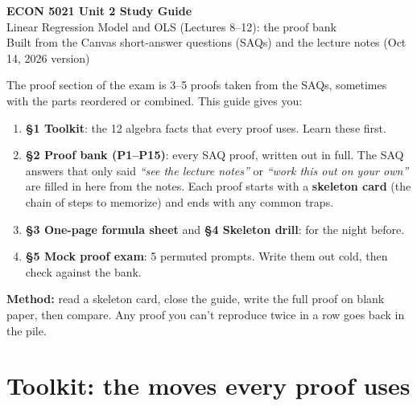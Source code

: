 \documentclass[11pt]{article}
\begin{document}
\begin{center}
{\LARGE\bfseries\color{ink} ECON 5021 Unit 2 Study Guide}\\[4pt]
{\large Linear Regression Model and OLS (Lectures 8--12): the proof bank}\\[2pt]
{\small Built from the Canvas short-answer questions (SAQs) and the lecture notes (Oct 14, 2026 version)}
\end{center}

\begin{tcolorbox}[colback=white,colframe=key,boxrule=0.8pt,arc=2pt,title={\bfseries How to use this guide}]
The proof section of the exam is 3--5 proofs taken from the SAQs, sometimes with the parts reordered or combined. This guide gives you:
\begin{enumerate}[nosep,leftmargin=1.4em]
\item \textbf{§1 Toolkit}: the 12 algebra facts that every proof uses. Learn these first.
\item \textbf{§2 Proof bank (P1--P15)}: every SAQ proof, written out in full. The SAQ answers that only said \emph{``see the lecture notes''} or \emph{``work this out on your own''} are filled in here from the notes. Each proof starts with a \textbf{skeleton card} (the chain of steps to memorize) and ends with any common traps.
\item \textbf{§3 One-page formula sheet} and \textbf{§4 Skeleton drill}: for the night before.
\item \textbf{§5 Mock proof exam}: 5 permuted prompts. Write them out cold, then check against the bank.
\end{enumerate}
\textbf{Method:} read a skeleton card, close the guide, write the full proof on blank paper, then compare. Any proof you can't reproduce twice in a row goes back in the pile.
\end{tcolorbox}

\tableofcontents
\newpage

\section{Toolkit: the moves every proof uses}
\end{document}
